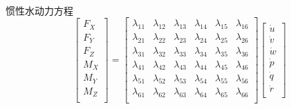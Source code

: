 \documentclass{ctexart}
\begin{document}
	\paragraph{}惯性水动力方程	
	\[\begin{bmatrix}
		F_X\\
		F_Y\\
		F_Z\\
		M_X\\
		M_Y\\
		M_Z\\
	\end{bmatrix}=
	\begin{bmatrix}
			\lambda_{11} & \lambda_{12} & \lambda_{13} & \lambda_{14} & \lambda_{15} & \lambda_{16}\\
			\lambda_{21} & \lambda_{22} & \lambda_{23} & \lambda_{24} & \lambda_{25} & \lambda_{26}\\
			\lambda_{31} & \lambda_{32} & \lambda_{33} & \lambda_{34} & \lambda_{35} & \lambda_{36}\\
			\lambda_{41} & \lambda_{42} & \lambda_{43} & \lambda_{44} & \lambda_{45} & \lambda_{46}\\
			\lambda_{51} & \lambda_{52} & \lambda_{53} & \lambda_{54} & \lambda_{55} & \lambda_{56}\\
			\lambda_{61} & \lambda_{62} & \lambda_{63} & \lambda_{64} & \lambda_{65} & \lambda_{66}\\	
	\end{bmatrix}
	\begin{bmatrix}
		\dot{u}\\
		\dot{v}\\
		\dot{w}\\
		\dot{p}\\
		\dot{q}\\
		\dot{r}\\
	\end{bmatrix}
	\]
\end{document}
